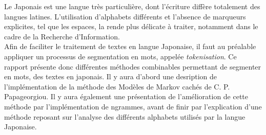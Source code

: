 
Le Japonais est une langue très particulière, dont l'écriture diffère totalement des langues latines. L'utilisation d'alphabets différents et l'absence de marqueurs explicites, tel que les espaces, la rende plus délicate à traiter, notamment dans le cadre de la Recherche d'Information.\\

Afin de faciliter le traitement de textes en langue Japonaise, il faut au préalable appliquer un processus de segmentation en mots, appelée \textit{tokenisation}. Ce rapport présente donc différentes méthodes combinables permettant de segmenter en mots, des textes en japonais. Il y aura d'abord une desription de l'implémentation de la méthode des Modèles de Markov cachés de C. P. Papageorgiou\cite{Papageorgiou:001}. Il y aura également une présentation de l'amélioration de cette méthode par l'implémentation de ngrammes, avant de finir par l'explication d'une méthode reposant sur l'analyse des différents alphabets utilisés par la langue Japonaise.\\
